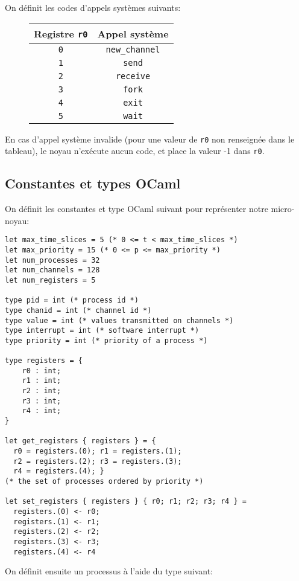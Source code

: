 \documentclass[french, toc]{../cs-classes/cs-classes}
\begin{document}
On définit les codes d'appels systèmes suivants:
\begin{figure}[!ht]
    \centering
    \begin{tabular}{c c}
        Registre \texttt{r0} & Appel système \\
        \hline
        \texttt{0} & \texttt{new\_channel} \\
        \texttt{1} & \texttt{send} \\
        \texttt{2} & \texttt{receive} \\
        \texttt{3} & \texttt{fork} \\
        \texttt{4} & \texttt{exit} \\
        \texttt{5} & \texttt{wait} \\
    \end{tabular}
\end{figure}
En cas d'appel système invalide (pour une valeur de \texttt{r0} non renseignée dans le tableau), le noyau n'exécute aucun code, et place la valeur -1 dans \texttt{r0}.

\subsection{Constantes et types OCaml}
On définit les constantes et type OCaml suivant pour représenter notre micro-noyau:
\begin{verbatim}
let max_time_slices = 5 (* 0 <= t < max_time_slices *)
let max_priority = 15 (* 0 <= p <= max_priority *)
let num_processes = 32
let num_channels = 128
let num_registers = 5

type pid = int (* process id *)
type chanid = int (* channel id *)
type value = int (* values transmitted on channels *)
type interrupt = int (* software interrupt *)
type priority = int (* priority of a process *)

type registers = {
    r0 : int;
    r1 : int;
    r2 : int;
    r3 : int;
    r4 : int; 
}

let get_registers { registers } = {
  r0 = registers.(0); r1 = registers.(1);
  r2 = registers.(2); r3 = registers.(3);
  r4 = registers.(4); }
(* the set of processes ordered by priority *)

let set_registers { registers } { r0; r1; r2; r3; r4 } =
  registers.(0) <- r0; 
  registers.(1) <- r1;
  registers.(2) <- r2; 
  registers.(3) <- r3;
  registers.(4) <- r4
\end{verbatim}

\noindent On définit ensuite un processus à l'aide du type suivant:
\end{document}
